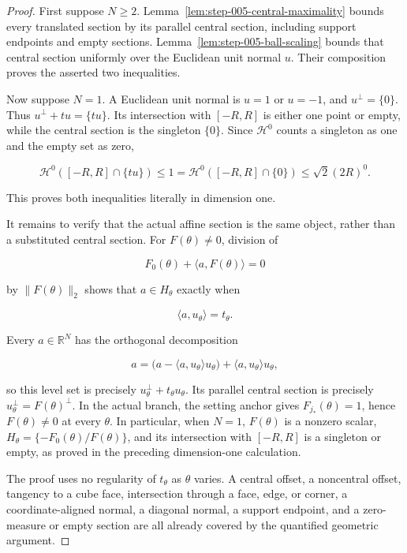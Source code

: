 \begin{proof}
First suppose \(N\geq2\). Lemma~\ref{lem:step-005-central-maximality} bounds every translated section by its parallel central section, including support endpoints and empty sections. Lemma~\ref{lem:step-005-ball-scaling} bounds that central section uniformly over the Euclidean unit normal \(u\). Their composition proves the asserted two inequalities.

Now suppose \(N=1\). A Euclidean unit normal is \(u=1\) or \(u=-1\), and \(u^\perp=\{0\}\). Thus \(u^\perp+tu=\{tu\}\). Its intersection with \([-R,R]\) is either one point or empty, while the central section is the singleton \(\{0\}\). Since \(\mathcal H^0\) counts a singleton as one and the empty set as zero,

\begin{equation}
\label{eq:appendix-display-168}
\mathcal H^0([-R,R]\cap\{tu\})
\leq1
=\mathcal H^0([-R,R]\cap\{0\})
\leq\sqrt2(2R)^0.
\end{equation}

This proves both inequalities literally in dimension one.

It remains to verify that the actual affine section is the same object, rather than a substituted central section. For \(F(\theta)\ne0\), division of

\begin{equation}
\label{eq:appendix-display-169}
F_0(\theta)+\langle a,F(\theta)\rangle=0
\end{equation}

by \(\|F(\theta)\|_2\) shows that \(a\in H_\theta\) exactly when

\begin{equation}
\label{eq:appendix-display-170}
\langle a,u_\theta\rangle=t_\theta.
\end{equation}

Every \(a\in\mathbb R^N\) has the orthogonal decomposition

\begin{equation}
\label{eq:appendix-display-171}
a=\bigl(a-\langle a,u_\theta\rangle u_\theta\bigr)
 +\langle a,u_\theta\rangle u_\theta,
\end{equation}

so this level set is precisely \(u_\theta^\perp+t_\theta u_\theta\). Its parallel central section is precisely \(u_\theta^\perp=F(\theta)^\perp\). In the actual branch, the setting anchor gives \(F_{j_*}(\theta)=1\), hence \(F(\theta)\ne0\) at every \(\theta\). In particular, when \(N=1\), \(F(\theta)\) is a nonzero scalar, \(H_\theta=\{-F_0(\theta)/F(\theta)\}\), and its intersection with \([-R,R]\) is a singleton or empty, as proved in the preceding dimension-one calculation.

The proof uses no regularity of \(t_\theta\) as \(\theta\) varies. A central offset, a noncentral offset, tangency to a cube face, intersection through a face, edge, or corner, a coordinate-aligned normal, a diagonal normal, a support endpoint, and a zero-measure or empty section are all already covered by the quantified geometric argument.
\end{proof}


